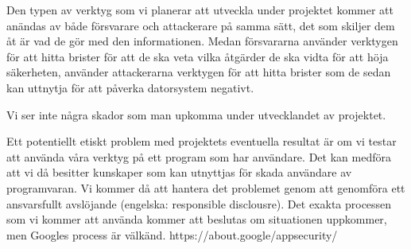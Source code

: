 Den typen av verktyg som vi planerar att utveckla under projektet kommer att anändas av både försvarare och attackerare på samma sätt, det som skiljer dem åt är vad de gör med den informationen.
Medan försvararna använder verktygen för att hitta brister för att de ska veta vilka åtgärder de ska vidta för att höja säkerheten, använder attackerarna verktygen för att hitta brister som de sedan kan uttnytja för att påverka datorsystem negativt.



Vi ser inte några skador som man upkomma under utvecklandet av projektet.



Ett potentiellt etiskt problem med projektets eventuella resultat är om vi testar att använda våra verktyg på ett program som har användare.
Det kan medföra att vi då besitter kunskaper som kan utnyttjas för skada användare av programvaran.
Vi kommer då att hantera det problemet genom att genomföra ett ansvarsfullt avslöjande (engelska: responsible disclousre).
Det exakta processen som vi kommer att använda kommer att beslutas om situationen uppkommer, men Googles process är välkänd. https://about.google/appsecurity/

